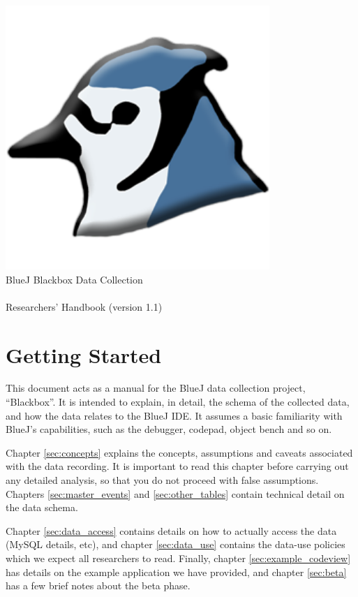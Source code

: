 \documentclass{report}
\begin{document}
\begin{titlepage}
  \begin{center}
    \includegraphics[width=10cm]{../../lib/images/bluej-icon-256.png}\\
    \huge BlueJ Blackbox Data Collection\\~\\Researchers' Handbook
    (version 1.1)
  \end{center}
\end{titlepage}

\section*{Getting Started}

This document acts as a manual for the BlueJ data collection project,
``Blackbox''.  It is intended to explain, in detail, the schema of the
collected data, and how the data relates to the BlueJ IDE.  It assumes a basic
familiarity with BlueJ's capabilities, such as the debugger, codepad, object
bench and so on.

Chapter \ref{sec:concepts} explains the concepts, assumptions and caveats
associated with the data recording.  It is important to read this chapter
before carrying out any detailed analysis, so that you do not proceed with
false assumptions.  Chapters \ref{sec:master_events} and
\ref{sec:other_tables} contain technical detail on the data schema.

Chapter \ref{sec:data_access} contains details on how to actually access the
data (MySQL details, etc), and chapter \ref{sec:data_use} contains the
data-use policies which we expect all researchers to read.  Finally, chapter
\ref{sec:example_codeview} has details on the example application we have
provided, and chapter \ref{sec:beta} has a few brief notes about the beta phase.
\end{document}
